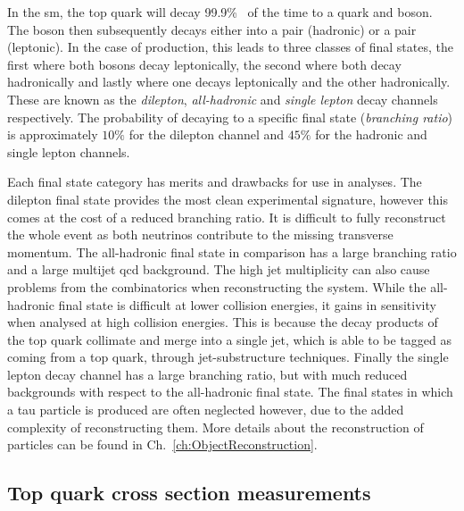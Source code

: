 In the \acrshort{sm}, the top quark will decay 99.9\%~\cite{PDG} of the time to a \bquark{} quark and \Wboson{} boson.
The \Wboson{} boson then subsequently decays either into a \qpqbar{} pair (hadronic) or a \lepton{}\neutrinobar{} pair (leptonic).
In the case of \ttbar{} production, this leads to three classes of final states, the first where both \Wboson{} bosons decay leptonically, the second where both decay  hadronically and lastly where one decays leptonically and the other hadronically.
These are known as the \textit{dilepton}, \textit{all-hadronic} and \textit{single lepton} decay channels respectively.
The probability of decaying to a specific final state (\textit{branching ratio}) is approximately $10\%$ for the dilepton channel and $45\%$ for the hadronic and single lepton channels.

Each final state category has merits and drawbacks for use in analyses. 
The dilepton final state provides the most clean experimental signature, however this comes at the cost of a reduced branching ratio.
It is difficult to fully reconstruct the whole event as both neutrinos contribute to the missing transverse momentum.
The all-hadronic final state in comparison has a large branching ratio and a large multijet \acrshort{qcd} background.
The high jet multiplicity can also cause problems from the combinatorics when reconstructing the \ttbar{} system.
While the all-hadronic final state is difficult at lower collision energies, it gains in sensitivity when analysed at high collision energies.
This is because the decay products of the top quark collimate and merge into a single jet, which is able to be tagged as coming from a top quark, through jet-substructure techniques.
Finally the single lepton decay channel has a large branching ratio, but with much reduced backgrounds with respect to the all-hadronic final state. 
The final states in which a tau particle is produced are often neglected however, due to the added complexity of reconstructing them.
More details about the reconstruction of particles can be found in Ch.~\ref{ch:ObjectReconstruction}.

\subsection{Top quark cross section measurements} %
\label{sub:top_quark_cross_section_measurements}

